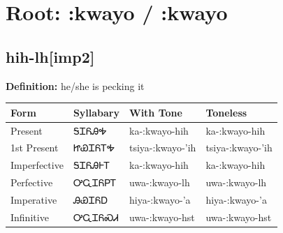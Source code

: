 \documentclass{article}%
\begin{document}
%
\normalsize%
\section*{Root: :kwayo / :kwayo}%
\subsection*{hih-lh[imp2]}%
\textbf{Definition: }%
he/she is pecking it%
\\[0.5em]%
\begin{tabular}{|l|l|l|l|}%
\hline%
\textbf{Form}&\textbf{Syllabary}&\textbf{With Tone}&\textbf{Toneless}\\%
\hline%
Present&ᎦᏆᏲᎯᎭ&ka{-}:kwayo{-}hih&ka{-}:kwayo{-}hih\\%
1st Present&ᏥᏯᏆᏲᎢᎭ&tsiya{-}:kwayo{-}'ih&tsiya{-}:kwayo{-}'ih\\%
Imperfective&ᎦᏆᏲᎯᎰᎢ&ka{-}:kwayo{-}hih&ka{-}:kwayo{-}hih\\%
Perfective&ᎤᏩᏆᏲᏢᎢ&uwa{-}:kwayo{-}lh&uwa{-}:kwayo{-}lh\\%
Imperative&ᎯᏯᏆᏲᎠ&hiya{-}:kwayo{-}'a&hiya{-}:kwayo{-}'a\\%
Infinitive&ᎤᏩᏆᏲᏍᏗ&uwa{-}:kwayo{-}hst&uwa{-}:kwayo{-}hst\\%
\hline%
\end{tabular}%
\\[1em]%
\end{document}
